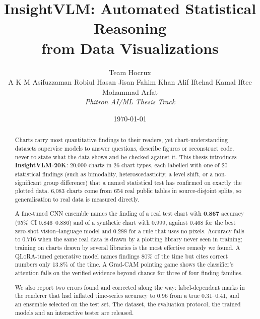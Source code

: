 \documentclass[12pt,a4paper]{report}
\title{\textbf{InsightVLM: Automated Statistical Reasoning\\from Data Visualizations}}
\author{Team Hocrux\\[0.4em]
A K M Asifuzzaman \quad Robiul Hasan Jisan \quad Fahim Khan Alif \quad Iftehad Kamal Iftee \quad Mohammad Arfat\\[0.6em]
\textit{Phitron AI/ML Thesis Track}}
\date{\today}
\begin{document}
\maketitle

\begin{abstract}
\noindent
Charts carry most quantitative findings to their readers, yet chart-understanding
datasets supervise models to answer questions, describe figures or reconstruct code,
never to state what the data shows and be checked against it. This thesis introduces
\textbf{InsightVLM-20K}: 20{,}000 charts in 26 chart types, each labelled with one of 20
statistical findings (such as bimodality, heteroscedasticity, a level shift, or a
non-significant group difference) that a named statistical test has confirmed on exactly
the plotted data. 6{,}083 charts come from 654 real public tables in source-disjoint
splits, so generalisation to real data is measured directly.

A fine-tuned CNN ensemble names the finding of a real test chart with \textbf{0.867}
accuracy (95\% CI 0.846--0.886) and of a synthetic chart with 0.999, against 0.468 for the
best zero-shot vision--language model and 0.288 for a rule that uses no pixels. Accuracy
falls to 0.716 when the same real data is drawn by a plotting library never seen in
training; training on charts drawn by several libraries is the most effective remedy we
found. A QLoRA-tuned generative model names findings 80\% of the time but cites correct
numbers only 13.8\% of the time. A Grad-CAM pointing game shows the classifier's attention
falls on the verified evidence beyond chance for three of four finding families.

We also report two errors found and corrected along the way: label-dependent marks in
the renderer that had inflated time-series accuracy to 0.96 from a true 0.31--0.41, and an
ensemble selected on the test set. The dataset, the evaluation protocol, the trained
models and an interactive tester are released.
\end{abstract}

\tableofcontents





\end{document}
